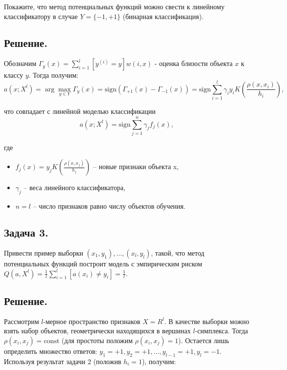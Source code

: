 Покажите, что метод потенциальных функций можно свести к линейному классификатору в случае $Y=\{-1, +1\}$ (бинарная классификация).

\subsection*{Решение.}

Обозначим $\Gamma_y(x) = \sum\limits_{i=1}^l[y^{(i)}=y]w(i,x)$ - оценка близости объекта $x$ к классу $y$. Тогда получим:
\begin{equation*}
	\displaystyle a(x; X^l) = \arg\max_{y\in Y} \Gamma_y(x) = \text{sign} \left(\Gamma_{+1}(x) - \Gamma_{-1}(x)\right) =  \text{sign} \sum\limits_{i=1}^l \gamma_i y_i K\left(\frac{\rho(x, x_i)}{h_i}\right),
\end{equation*}

что совпадает с линейной моделью классификации 
\begin{equation*}
	\displaystyle a(x; X^l) = \text{sign} \sum\limits_{j=1}^n \gamma_j f_j(x),
\end{equation*}

где

\begin{itemize}
	\item $f_j(x) = y_j K\left(\frac{\rho(x, x_j)}{h_j}\right)$ -- новые признаки объекта x,
	\item $\gamma_j$ -- веса линейного классификатора, 
	\item $n = l$ -- число признаков равно числу объектов обучения.
\end{itemize}

\subsection*{Задача 3.}

Привести пример выборки $(x_1, y_1),\dots,(x_l, y_l)$, такой, что метод потенциальных функций построит модель с эмпирическим риском $ Q(a,X^l) = \frac{1}{l} \sum\limits_{i=1}^{l} [a(x_i) \neq y_i] = \frac{1}{l}$.

\subsection*{Решение.}

Рассмотрим $l$-мерное пространство признаков $X=R^l$. В качестве выборки можно взять набор объектов, геометрически находящихся в вершинах $l$-симплекса. Тогда $\rho(x_i, x_j) = \text{const}$ (для простоты положим $\rho(x_i, x_j) = 1$). Остается лишь определить множество ответов: $y_1=+1, y_2=+1, \dots, y_{l-1}=+1, y_l=-1$. Используя результат задачи 2 (положив $h_i=1$), получим:

